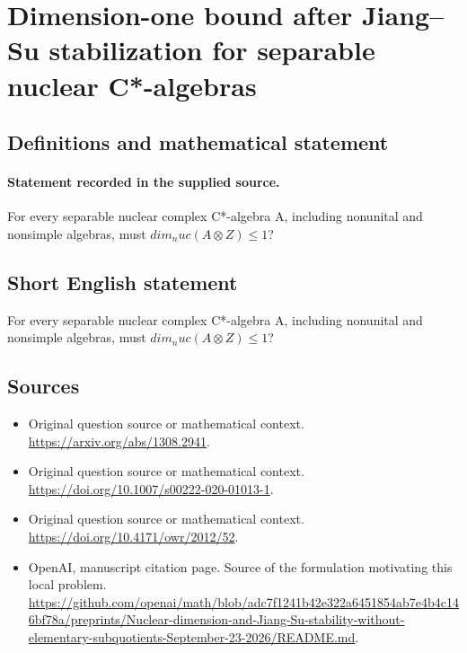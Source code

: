 \documentclass[11pt]{article}
\begin{document}
\section*{Dimension-one bound after Jiang–Su stabilization for separable nuclear C*-algebras}\label{30007314}
\subsection{Definitions and mathematical statement}
\paragraph{Statement recorded in the supplied source.}
For every separable nuclear complex C*-algebra A, including nonunital and nonsimple algebras, must $dim_nuc(A\otimes Z)\leq 1$?
\subsection{Short English statement}
For every separable nuclear complex C*-algebra A, including nonunital and nonsimple algebras, must $dim_nuc(A\otimes Z)\leq 1$?
\subsection{Sources}
\begin{itemize}
\item[S1] Original question source or mathematical context.
\url{https://arxiv.org/abs/1308.2941}.
\item[S2] Original question source or mathematical context.
\url{https://doi.org/10.1007/s00222-020-01013-1}.
\item[S3] Original question source or mathematical context.
\url{https://doi.org/10.4171/owr/2012/52}.
\item[S4] OpenAI, manuscript citation page. Source of the formulation motivating this local problem.
\url{https://github.com/openai/math/blob/adc7f1241b42e322a6451854ab7e4b4c146bf78a/preprints/Nuclear-dimension-and-Jiang-Su-stability-without-elementary-subquotients-September-23-2026/README.md}.
\end{itemize}
\end{document}
